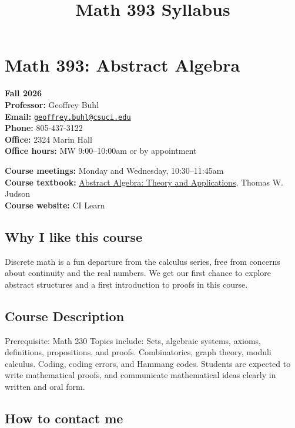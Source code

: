 \documentclass[
  letterpaper,
  DIV=11,
  numbers=noendperiod]{scrartcl}
\title{Math 393 Syllabus}
\author{}
\date{}
\begin{document}
\maketitle


\section{Math 393: Abstract Algebra}\label{math-393-abstract-algebra}

\textbf{Fall 2026}\\
\textbf{Professor:} Geoffrey Buhl\\
\textbf{Email:}
\href{mailto:geoffrey.buhl@csuci.edu}{\nolinkurl{geoffrey.buhl@csuci.edu}}\\
\textbf{Phone:} 805-437-3122\\
\textbf{Office:} 2324 Marin Hall\\
\textbf{Office hours:} MW 9:00--10:00am or by appointment

\textbf{Course meetings:} Monday and Wednesday, 10:30--11:45am\\
\textbf{Course textbook:}
\href{https://judsonbooks.org/aata-files/aata-html/aata-toc.html}{Abstract
Algebra: Theory and Applications}, Thomas W. Judson\\
\textbf{Course website:} CI Learn

\subsection{Why I like this course}\label{why-i-like-this-course}

Discrete math is a fun departure from the calculus series, free from
concerns about continuity and the real numbers. We get our first chance
to explore abstract structures and a first introduction to proofs in
this course.

\subsection{Course Description}\label{course-description}

Prerequisite: Math 230 Topics include: Sets, algebraic systems, axioms,
definitions, propositions, and proofs. Combinatorics, graph theory,
moduli calculus. Coding, coding errors, and Hammang codes. Students are
expected to write mathematical proofs, and communicate mathematical
ideas clearly in written and oral form.

\subsection{How to contact me}\label{how-to-contact-me}
\end{document}
